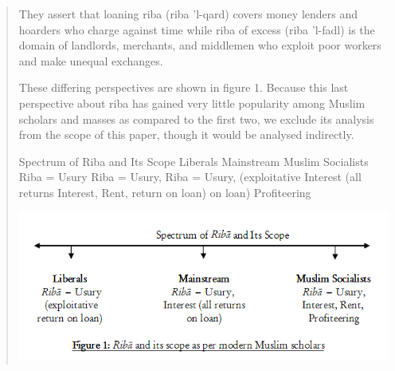 \begin{quote}
They assert that loaning riba (riba 'l-qard) covers money lenders and hoarders who charge against time while riba of excess (riba 'l-fadl) is the domain of landlords, merchants, and middlemen who exploit poor workers and make unequal exchanges. 

These differing perspectives are shown in figure 1. Because this last perspective about riba has gained very little popularity among Muslim scholars and masses as compared to the first two, we exclude its analysis from the scope of this paper, though it would be analysed indirectly.


Spectrum of Riba and Its Scope Liberals Mainstream Muslim Socialists Riba = Usury Riba = Usury, Riba = Usury, (exploitative Interest (all returns Interest, Rent, return on loan) on loan) Profiteering


\includegraphics[width=\textwidth]{CourantsIslamContemporain/ImagesCourantsIslamContemporain/Riba.png}




\end{quote}
